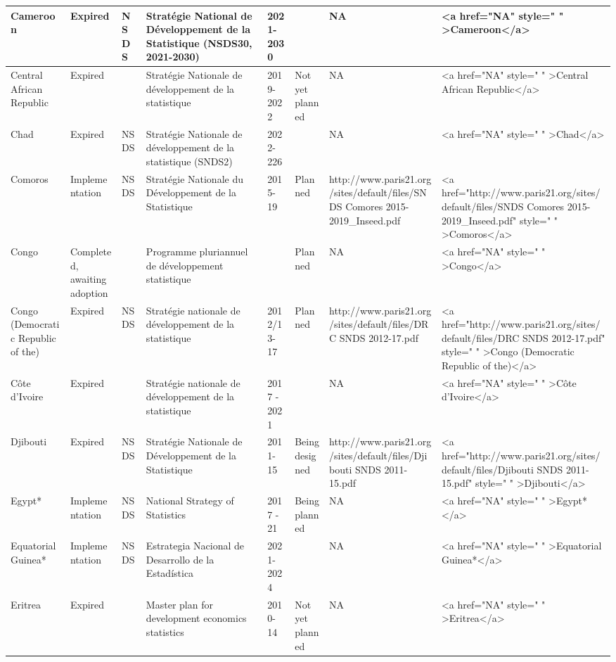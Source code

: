 \documentclass[
]{article}
\begin{document}
\begin{table}
\begin{tabular}[t]{l|l|l|l|l|l|l|l}
\hline
Cameroon & Expired & NSDS & Stratégie National de Développement de la Statistique (NSDS30, 2021-2030) & 2021-2030 &  & NA & <a href="NA" style="     " >Cameroon</a>\\
\hline
Central African Republic & Expired &  & Stratégie Nationale de développement de la statistique & 2019-2022 & Not yet planned & NA & <a href="NA" style="     " >Central African Republic</a>\\
\hline
Chad & Expired & NSDS & Stratégie Nationale de développement de la statistique (SNDS2) & 2022-226 &  & NA & <a href="NA" style="     " >Chad</a>\\
\hline
Comoros & Implementation & NSDS & Stratégie Nationale du Développement de la Statistique & 2015-19 & Planned & http://www.paris21.org/sites/default/files/SNDS Comores 2015-2019_Inseed.pdf & <a href="http://www.paris21.org/sites/default/files/SNDS Comores 2015-2019_Inseed.pdf" style="     " >Comoros</a>\\
\hline
Congo & Completed, awaiting adoption &  & Programme pluriannuel de développement statistique  &  & Planned & NA & <a href="NA" style="     " >Congo</a>\\
\hline
Congo (Democratic Republic of the) & Expired & NSDS & Stratégie nationale de développement de la statistique & 2012/13-17 & Planned & http://www.paris21.org/sites/default/files/DRC SNDS 2012-17.pdf & <a href="http://www.paris21.org/sites/default/files/DRC SNDS 2012-17.pdf" style="     " >Congo (Democratic Republic of the)</a>\\
\hline
Côte d'Ivoire & Expired &  & Stratégie nationale de développement de la statistique & 2017 - 2021 &  & NA & <a href="NA" style="     " >Côte d'Ivoire</a>\\
\hline
Djibouti & Expired & NSDS & Stratégie Nationale de Développement de la Statistique & 2011-15 & Being designed & http://www.paris21.org/sites/default/files/Djibouti SNDS 2011-15.pdf & <a href="http://www.paris21.org/sites/default/files/Djibouti SNDS 2011-15.pdf" style="     " >Djibouti</a>\\
\hline
Egypt* & Implementation & NSDS & National Strategy of Statistics & 2017 - 21 & Being planned & NA & <a href="NA" style="     " >Egypt*</a>\\
\hline
Equatorial Guinea* & Implementation & NSDS & Estrategia Nacional de Desarrollo de la Estadística & 2021-2024 &  & NA & <a href="NA" style="     " >Equatorial Guinea*</a>\\
\hline
Eritrea & Expired &  & Master plan for development economics statistics & 2010-14 & Not yet planned & NA & <a href="NA" style="     " >Eritrea</a>\\

\end{tabular}
\end{table}
\end{document}
